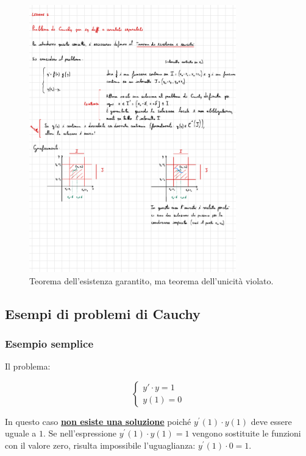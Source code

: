 \documentclass[a4paper]{article}
\begin{document}
	\begin{figure}[!htp]
		\centering
		\includegraphics[width=0.8\textwidth]{img/prob_cauchy-variabili_separabili_violazione.pdf}
		\caption{Teorema dell'esistenza garantito, ma teorema dell'unicità violato.}
	\end{figure}

	\newpage
	
	\subsection{Esempi di problemi di Cauchy}
	
	\subsubsection[Esempio semplice]{\textcolor{Green4}{\textbf{Esempio semplice}}}
	
	\noindent
	Il problema:
	
	\begin{equation*}
		\begin{cases}
			y' \cdot y = 1 \\
			y\left(1\right) = 0
		\end{cases}
	\end{equation*}
	
	\noindent
	In questo caso \textbf{\underline{non esiste una soluzione}} poiché $y^{'}\left(1\right) \cdot y\left(1\right)$ deve essere uguale a $1$. Se nell'espressione $y^{'}\left(1\right) \cdot y\left(1\right) = 1$ vengono sostituite le funzioni con il valore zero, risulta impossibile l'uguaglianza: $y^{'}\left(1\right) \cdot 0 = 1$.\newline
	
\end{document}
